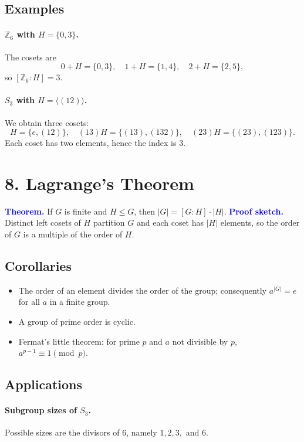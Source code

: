 \documentclass[12pt]{article}
\begin{document}
\subsection*{Examples}
\paragraph{$\mathbb{Z}_6$ with $H=\{0,3\}$.}
The cosets are
\[
0+H=\{0,3\},\quad 1+H=\{1,4\},\quad 2+H=\{2,5\},
\]
so $[\mathbb{Z}_6:H]=3$.

\paragraph{$S_3$ with $H=\langle(12)\rangle$.}
We obtain three cosets:
\[
H=\{e,(12)\},\quad (13)H=\{(13),(132)\},\quad (23)H=\{(23),(123)\}.
\]
Each coset has two elements, hence the index is $3$.

\section*{8. Lagrange's Theorem}
\textcolor{blue}{\textbf{Theorem.}} If $G$ is finite and $H\leq G$, then $|G|=[G:H]\cdot|H|$.
\textcolor{blue}{\textbf{Proof sketch.}} Distinct left cosets of $H$ partition $G$ and each coset has $|H|$ elements, so the order of $G$ is a multiple of the order of $H$.

\subsection*{Corollaries}
\begin{itemize}
  \item The order of an element divides the order of the group; consequently $a^{|G|}=e$ for all $a$ in a finite group.
  \item A group of prime order is cyclic.
  \item Fermat's little theorem: for prime $p$ and $a$ not divisible by $p$, $a^{p-1}\equiv1\pmod p$.
\end{itemize}

\subsection*{Applications}
\paragraph{Subgroup sizes of $S_3$.}
Possible sizes are the divisors of $6$, namely $1,2,3,$ and $6$.
\end{document}
